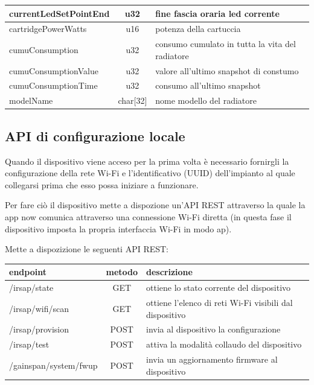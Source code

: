 \documentclass[12pt,a4paper,twoside,titlepage]{book}
\begin{document}
\begin{center}
\begin{longtable}{| p{5cm} | c | p{8cm} |}
    currentLedSetPointEnd & u32 & fine fascia oraria \acrshort{led} corrente\\ \hline
    cartridgePowerWatts & u16 & potenza della cartuccia\\ \hline
    cumuConsumption & u32 & consumo cumulato in tutta la vita del radiatore\\ \hline
    cumuConsumptionValue & u32 & valore all’ultimo snapshot di constumo\\ \hline
    cumuConsumptionTime & u32 & consumo all’ultimo snapshot\\ \hline
    modelName & char[32] & nome modello del radiatore\\ \hline
\end{longtable}
\end{center}

\subsection{API di configurazione locale}

Quando il dispositivo viene acceso per la prima volta è necessario fornirgli la
configurazione della rete Wi-Fi e l'identificativo (UUID) dell'impianto al quale
collegarsi prima che esso possa iniziare a funzionare.

Per fare ciò il dispositivo mette a dispozione un'API REST attraverso la quale la
app \Gls{now} comunica attraverso una connessione Wi-Fi diretta (in questa fase
il dispositivo imposta la propria interfaccia Wi-Fi in modo \acrshort{ap}).

Mette a dispozizione le seguenti API REST:

\begin{center}
\begin{tabular}{| l | c | p{6cm} |}
    \hline \textbf{endpoint} & \textbf{metodo} & \textbf{descrizione} \\
    \hline /irsap/state & GET & ottiene lo stato corrente del dispositivo \\
    \hline /irsap/wifi/scan & GET & ottiene l'elenco di reti Wi-Fi visibili dal dispositivo \\
    \hline /irsap/provision & POST & invia al dispositivo la configurazione \\
    \hline /irsap/test & POST & attiva la modalità collaudo del dispositivo \\
    \hline /gainspan/system/fwup & POST & invia un aggiornamento \gls{firmware} al dispositivo \\
    \hline
\end{tabular}
\end{center}
\end{document}
